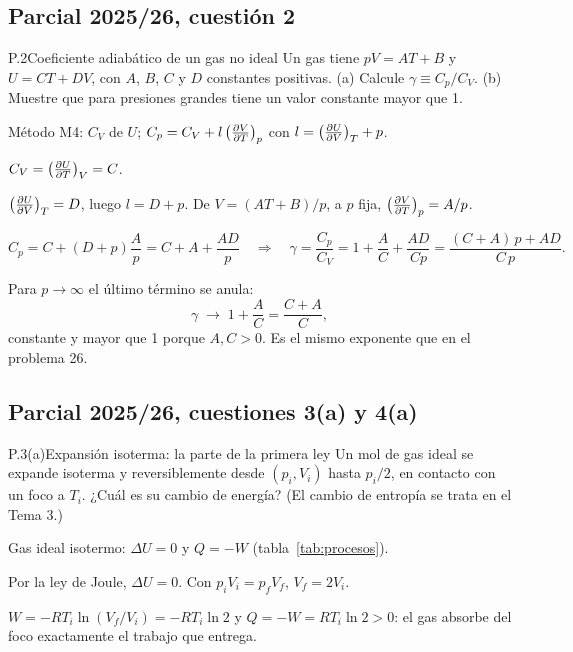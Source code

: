 \subsection{Parcial 2025/26, cuestión 2}
\begin{problema}{P.2}{Coeficiente adiabático de un gas no ideal}
Un gas tiene $pV=AT+B$ y $U=CT+DV$, con $A$, $B$, $C$ y $D$ constantes positivas. (a) Calcule $\gamma\equiv C_p/C_V$.
(b) Muestre que para presiones grandes tiene un valor constante mayor que 1.
\end{problema}

\begin{resolucion}
\idea Método M4: $C_V$ de $U$; $C_p=C_V+l\,\bigl(\tfrac{\partial V}{\partial T}\bigr)_{p}$ con $l=\bigl(\tfrac{\partial U}{\partial V}\bigr)_{T}+p$.

 $C_V=\bigl(\tfrac{\partial U}{\partial T}\bigr)_{V}=C$.

 $\bigl(\tfrac{\partial U}{\partial V}\bigr)_{T}=D$, luego $l=D+p$. De $V=(AT+B)/p$, a $p$ fija,
$\bigl(\tfrac{\partial V}{\partial T}\bigr)_{p}=A/p$.

\[
  C_p=C+(D+p)\frac Ap=C+A+\frac{AD}p
  \quad\Longrightarrow\quad
  \boxed{\gamma=\frac{C_p}{C_V}=1+\frac AC+\frac{AD}{Cp}=\frac{(C+A)\,p+AD}{C\,p}}.
\]

 Para $p\to\infty$ el último término se anula:
\[
  \gamma\;\longrightarrow\;1+\frac AC=\frac{C+A}{C},
\]
constante y mayor que 1 porque $A,C>0$. Es el mismo exponente que en el problema 26.
\end{resolucion}

\subsection{Parcial 2025/26, cuestiones 3(a) y 4(a)}
\begin{problema}{P.3(a)}{Expansión isoterma: la parte de la primera ley}
Un mol de gas ideal se expande isoterma y reversiblemente desde $(p_i,V_i)$ hasta $p_i/2$, en contacto con un
foco a $T_i$. ¿Cuál es su cambio de energía? (El cambio de entropía se trata en el Tema 3.)
\end{problema}

\begin{resolucion}
\idea Gas ideal isotermo: $\Delta U=0$ y $Q=-W$ (tabla~\ref{tab:procesos}).

 Por la ley de Joule, $\boxed{\Delta U=0}$. Con $p_iV_i=p_fV_f$, $V_f=2V_i$.

 $W=-RT_i\ln(V_f/V_i)=-RT_i\ln2$ y $Q=-W=RT_i\ln2>0$: el gas absorbe del foco exactamente el
trabajo que entrega.
\end{resolucion}

